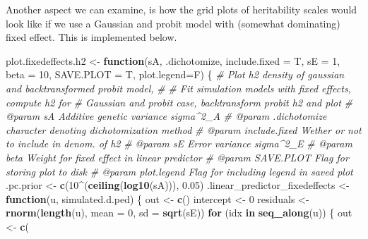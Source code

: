 \documentclass[
]{article}
\newenvironment{Shaded}{\begin{snugshade}}{\end{snugshade}}
\newcommand{\AttributeTok}[1]{\textcolor[rgb]{0.13,0.29,0.53}{#1}}
\newcommand{\CommentTok}[1]{\textcolor[rgb]{0.56,0.35,0.01}{\textit{#1}}}
\newcommand{\ControlFlowTok}[1]{\textcolor[rgb]{0.13,0.29,0.53}{\textbf{#1}}}
\newcommand{\DecValTok}[1]{\textcolor[rgb]{0.00,0.00,0.81}{#1}}
\newcommand{\FloatTok}[1]{\textcolor[rgb]{0.00,0.00,0.81}{#1}}
\newcommand{\FunctionTok}[1]{\textcolor[rgb]{0.13,0.29,0.53}{\textbf{#1}}}
\newcommand{\NormalTok}[1]{#1}
\newcommand{\OtherTok}[1]{\textcolor[rgb]{0.56,0.35,0.01}{#1}}
\newcommand{\SpecialCharTok}[1]{\textcolor[rgb]{0.81,0.36,0.00}{\textbf{#1}}}
\begin{document}
Another aspect we can examine, is how the grid plots of heritability
scales would look like if we use a Gaussian and probit model with
(somewhat dominating) fixed effect. This is implemented below.

\begin{Shaded}
\begin{Highlighting}[]
\NormalTok{plot.fixedeffects.h2 }\OtherTok{\textless{}{-}} \ControlFlowTok{function}\NormalTok{(sA, .dichotomize, }\AttributeTok{include.fixed =}\NormalTok{ T,}
                                 \AttributeTok{sE =} \DecValTok{1}\NormalTok{, }\AttributeTok{beta =} \DecValTok{10}\NormalTok{, }\AttributeTok{SAVE.PLOT =}\NormalTok{ T,}
                                 \AttributeTok{plot.legend=}\NormalTok{F) \{}
  \CommentTok{\#\textquotesingle{} Plot h2 density of gaussian and backtransformed probit model,}
  \CommentTok{\#\textquotesingle{} }
  \CommentTok{\#\textquotesingle{} Fit simulation models with fixed effects, compute h2 for}
  \CommentTok{\#\textquotesingle{} Gaussian and probit case, backtransform probit h2 and plot}
  \CommentTok{\#\textquotesingle{} @param sA Additive genetic variance sigma\^{}2\_A}
  \CommentTok{\#\textquotesingle{} @param .dichotomize character denoting dichotomization method}
  \CommentTok{\#\textquotesingle{} @param include.fixed Wether or not to include in denom. of h2}
  \CommentTok{\#\textquotesingle{} @param sE Error variance sigma\^{}2\_E}
  \CommentTok{\#\textquotesingle{} @param beta Weight for fixed effect in linear predictor}
  \CommentTok{\#\textquotesingle{} @param SAVE.PLOT Flag for storing plot to disk}
  \CommentTok{\#\textquotesingle{} @param plot.legend Flag for including legend in saved plot}
\NormalTok{  .pc.prior }\OtherTok{\textless{}{-}} \FunctionTok{c}\NormalTok{(}\DecValTok{10}\SpecialCharTok{\^{}}\NormalTok{(}\FunctionTok{ceiling}\NormalTok{(}\FunctionTok{log10}\NormalTok{(sA))), }\FloatTok{0.05}\NormalTok{)}
\NormalTok{  .linear\_predictor\_fixedeffects }\OtherTok{\textless{}{-}} \ControlFlowTok{function}\NormalTok{(u, simulated.d.ped) \{}
\NormalTok{  out }\OtherTok{\textless{}{-}} \FunctionTok{c}\NormalTok{()}
\NormalTok{  intercept }\OtherTok{\textless{}{-}} \DecValTok{0}
\NormalTok{  residuals }\OtherTok{\textless{}{-}} \FunctionTok{rnorm}\NormalTok{(}\FunctionTok{length}\NormalTok{(u), }\AttributeTok{mean =} \DecValTok{0}\NormalTok{, }\AttributeTok{sd =} \FunctionTok{sqrt}\NormalTok{(sE))}
  \ControlFlowTok{for}\NormalTok{ (idx }\ControlFlowTok{in} \FunctionTok{seq\_along}\NormalTok{(u)) \{}
\NormalTok{    out }\OtherTok{\textless{}{-}} \FunctionTok{c}\NormalTok{(}

\end{Highlighting}
\end{Shaded}
\end{document}
